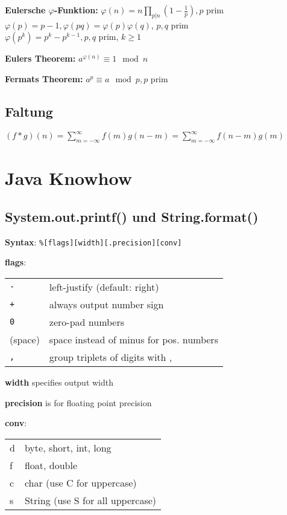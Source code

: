\documentclass[10pt,a4paper,ngerman,oneside,]{article}
\begin{document}
\begin{multicols}{2}
\textbf{Eulersche $\varphi$-Funktion:} $\varphi(n)=n\prod_{p|n}(1-\frac{1}{p}),p$ prim\\
$\varphi(p)=p-1,\varphi(pq)=\varphi(p)\varphi(q)$, $p,q$ prim\\
$\varphi(p^k)=p^k-p^{k-1},p,q$ prim, $k\geq 1$

\textbf{Eulers Theorem:} $a^{\varphi(n)}\equiv 1\mod n$

\textbf{Fermats Theorem:} $a^{p}\equiv a\mod p, p$ prim

\subsection{Faltung}
$
(f\ast g)(n) = \sum\limits_{m=-\infty}^{\infty}f(m)g(n-m)=\sum\limits_{m=-\infty}^{\infty}f(n-m)g(m)
$




\section{Java Knowhow}
\subsection{System.out.printf() und String.format()}
\textbf{Syntax}: \texttt{\%[flags][width][.precision][conv]}

\textbf{flags}: \\ \begin{tabular}{ll}
  \texttt{-} & left-justify (default: right) \\
  \texttt{+} & always output number sign \\
  \texttt{0} & zero-pad numbers \\
  (space)    & space instead of minus for pos. numbers \\
  \texttt{,} & group triplets of digits with ,
\end{tabular}

\textbf{width} specifies output width

\textbf{precision} is for floating point precision

\textbf{conv}: \\ \begin{tabular}{ll}
  d & byte, short, int, long \\
  f & float, double \\
  c & char (use C for uppercase) \\
  s & String (use S for all uppercase)
\end{tabular}

\end{multicols}

%
\end{document}
